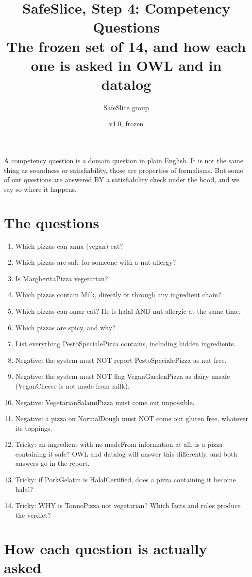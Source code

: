 \documentclass[11pt,a4paper]{article}
\title{SafeSlice, Step 4: Competency Questions\\ \large The frozen set of 14, and how each one is asked in OWL and in datalog}
\author{SafeSlice group}
\date{v1.0, frozen}
\begin{document}
\maketitle

\noindent A competency question is a domain question in plain English. It is not the same thing as soundness or satisfiability, those are properties of formalisms. But some of our questions are answered BY a satisfiability check under the hood, and we say so where it happens.

\section{The questions}
\begin{enumerate}[leftmargin=*, itemsep=2pt]
\item Which pizzas can anna (vegan) eat?
\item Which pizzas are safe for someone with a nut allergy?
\item Is MargheritaPizza vegetarian?
\item Which pizzas contain Milk, directly or through any ingredient chain?
\item Which pizzas can omar eat? He is halal AND nut allergic at the same time.
\item Which pizzas are spicy, and why?
\item List everything PestoSpecialePizza contains, including hidden ingredients.
\item Negative: the system must NOT report PestoSpecialePizza as nut free.
\item Negative: the system must NOT flag VeganGardenPizza as dairy unsafe (VeganCheese is not made from milk).
\item Negative: VegetarianSalamiPizza must come out impossible.
\item Negative: a pizza on NormalDough must NOT come out gluten free, whatever its toppings.
\item Tricky: an ingredient with no madeFrom information at all, is a pizza containing it safe? OWL and datalog will answer this differently, and both answers go in the report.
\item Tricky: if PorkGelatin is HalalCertified, does a pizza containing it become halal?
\item Tricky: WHY is TonnoPizza not vegetarian? Which facts and rules produce the verdict?
\end{enumerate}

\section{How each question is actually asked}
\end{document}
